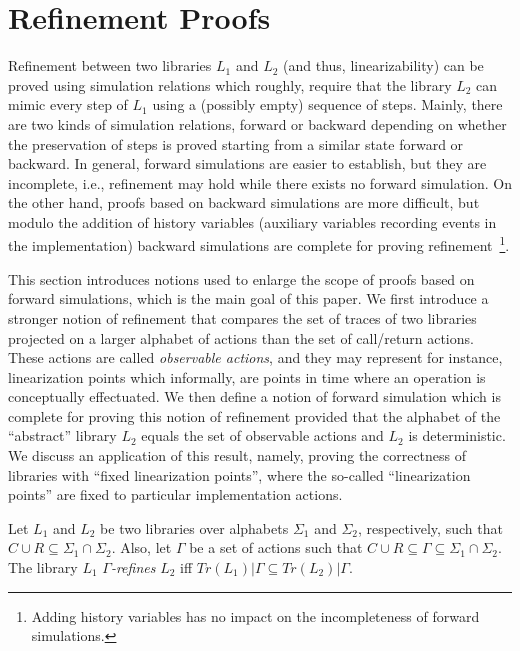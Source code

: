 
\section{Refinement Proofs}

Refinement between two libraries $L_1$ and $L_2$ (and thus, linearizability) can be proved using simulation relations which roughly, require that 
the library $L_2$ can mimic every step of $L_1$ using a (possibly empty) sequence of steps. Mainly, there are two kinds of simulation
relations, forward or backward depending on whether the preservation of steps is proved starting from a similar state
forward or backward. In general, forward simulations are easier to establish, but they are incomplete, i.e., refinement may hold while
there exists no forward simulation. On the other hand, proofs based on backward simulations are more difficult, but modulo the
addition of history variables (auxiliary variables recording events in the implementation) backward simulations are complete for 
proving refinement~\footnote{Adding history variables has no impact on the incompleteness of forward simulations.}.

This section introduces notions used to enlarge the scope of proofs based on forward simulations, which is the main goal of this paper.
We first introduce a stronger notion of refinement that compares the set of traces of two libraries projected
on a larger alphabet of actions than the set of call/return actions. These actions are called \emph{observable actions},
and they may represent for instance, linearization points which informally, are points in time where an operation 
is conceptually effectuated. We then define a notion of forward simulation which is complete for proving
this notion of refinement provided that the alphabet of the ``abstract'' library $L_2$ equals the set of 
observable actions and $L_2$ is deterministic. We discuss an application of this result, namely,
proving the correctness of libraries with ``fixed linearization points'', where the so-called ``linearization points''
are fixed to particular implementation actions.

\begin{dfn}\label{def:gref}
Let $L_1$ and $L_2$ be two libraries over alphabets $\Sigma_1$ and $\Sigma_2$, respectively, such that $C\cup R \subseteq \Sigma_1\cap\Sigma_2$. Also, let $\Gamma$ be a set of actions such that $C\cup R\subseteq \Gamma\subseteq \Sigma_1\cap\Sigma_2$. 
The library $L_1$ \emph{$\Gamma$-refines} $L_2$ if{f} $Tr(L_1) | \Gamma \subseteq Tr(L_2) | \Gamma$.
\end{dfn}

